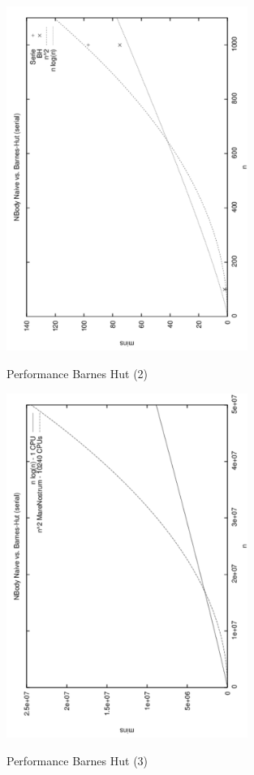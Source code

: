 \begin{figure}[!htbp]
  \centering
  \includegraphics[angle=270,origin=c,width=0.7\textwidth]{graphics/rendimiento2.png}
  \label{fig:perf-bh-2}
  \caption{Performance Barnes Hut (2)}
\end{figure}

\begin{figure}[!htbp]
  \centering
  \includegraphics[angle=270,origin=c,width=0.7\textwidth]{graphics/rendimiento3.png}
  \label{fig:perf-bh-3}
  \caption{Performance Barnes Hut (3)}
\end{figure}


